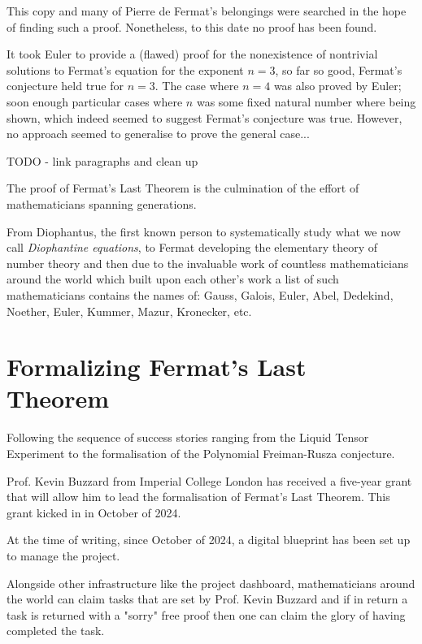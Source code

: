 This copy and many of Pierre de Fermat's belongings were searched in the hope of finding such a proof. Nonetheless, to this date no proof has been found.


It took Euler to provide a (flawed) proof for the nonexistence of nontrivial solutions to Fermat's equation for the exponent $n = 3$, so far so good, Fermat's conjecture held true for $n = 3$.
The case where $n = 4$ was also proved by Euler; soon enough particular cases where $n$ was some fixed natural number where being shown, which indeed seemed to suggest Fermat's conjecture was true.
However, no approach seemed to generalise to prove the general case...


TODO - link paragraphs and clean up

The proof of Fermat's Last Theorem is the culmination of the effort of mathematicians spanning generations.

From Diophantus, the first known person to systematically study what we now call \textit{Diophantine equations}, to Fermat developing the elementary theory of number theory and then due to the invaluable work of countless mathematicians 
around the world which built upon each other's work a list of such mathematicians contains the names of: Gauss, Galois, Euler, Abel, Dedekind, Noether, Euler, Kummer, Mazur, Kronecker, etc.



\section{Formalizing Fermat's Last Theorem}

Following the sequence of success stories ranging from the Liquid Tensor Experiment to the formalisation of the Polynomial Freiman-Rusza conjecture. 

Prof. Kevin Buzzard from Imperial College London has received a five-year grant that will allow him to lead the formalisation of Fermat's Last Theorem. This grant kicked in in October of 2024. 

At the time of writing, since October of 2024, a digital blueprint has been set up to manage the project.

Alongside other infrastructure like the project dashboard, mathematicians around the world can claim tasks that are set by Prof. Kevin Buzzard and if in return a task is returned with a "sorry" free proof then one can claim the glory of having completed the task.

